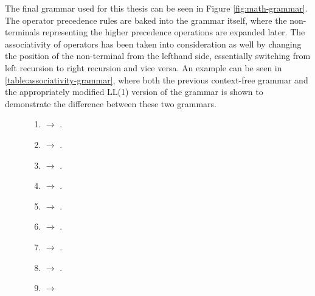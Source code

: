 The final grammar used for this thesis can be seen in Figure \ref{fig:math-grammar}. The operator precedence rules are baked into the grammar itself, where the non-terminals representing the higher precedence operations are expanded later. The associativity of operators has been taken into consideration as well by changing the position of the non-terminal from the lefthand side, essentially switching from left recursion to right recursion and vice versa. An example can be seen in \ref{table:associativity-grammar}, where both the previous context-free grammar and the appropriately modified LL(1) version of the grammar is shown to demonstrate the difference between these two grammars.

\begin{figure}[ht]
  \begin{multicols}{2}
    \begin{enumerate}
      \item {} $\rightarrow$  .

      \item {} $\rightarrow$   .
      \item {} $\rightarrow$    .
      \item {} $\rightarrow$    .
      \item {} $\rightarrow$ \code{$\varepsilon$} .

      \item {} $\rightarrow$   .
      \item {} $\rightarrow$    .
      \item {} $\rightarrow$    .
      \item {} $\rightarrow$ \mcode{"%

      \item \code{FACT} $\rightarrow$ \code{UNARY} \code{FACTx} .
      \item \code{FACTx} $\rightarrow$ \mcode{"!"} \code{FACTx} .
      \item \code{FACTx} $\rightarrow$ \code{$\varepsilon$} .

      \item \code{UNARY} $\rightarrow$ \mcode{"-"} \code{UNARY} .
      \item \code{UNARY} $\rightarrow$ \mcode{"+"} \code{UNARY} .
      \item \code{UNARY} $\rightarrow$ \code{POW} .

}
\end{enumerate}
\end{multicols}
\end{figure}
